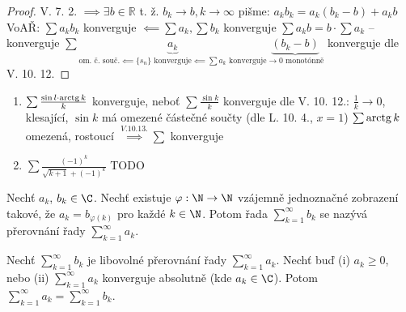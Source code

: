 \begin{proof}
    V. 7. 2. $\implies \exists b \in \mathbb R$ t. ž. $b_k \to b, k \to \infty$
    pišme: $a_kb_k=a_k(b_k-b)+a_kb$
    VoAŘ: $\sum a_kb_k$ konverguje $\impliedby \sum a_k, \sum b_k$ konverguje
    $\sum a_kb = b \cdot \sum a_k$ -- konverguje
    $\sum \underbrace{a_k}_{\text{om. č. souč.} \impliedby \{s_n\} \text{ konverguje}\impliedby \sum a_k \text{ konverguje}}\underbrace{(b_k-b)}_{\to 0 \text{ monotónně}}$ konverguje dle V. 10. 12.
\end{proof}

\begin{priklad}
    \begin{enumerate}[1)]
        \item $\sum \frac{\sin l \cdot \operatorname{arctg} k}{k}$ konverguje, neboť
            $\sum \frac{\sin k}{k}$ konverguje dle V. 10. 12.: $\frac{1}{k}\to 0$, klesající, $\sin k$ má omezené částečné součty (dle L. 10. 4., $x=1$)
            $\sum \operatorname{arctg} k$ omezená, rostoucí
            $\stackrel{V. 10. 13.}{\implies} \sum$ konverguje
        \item $\sum\frac{(-1)^k}{\sqrt{k+1}+(-1)^k}$ TODO
    \end{enumerate}
\end{priklad}

\begin{definice}
  Nechť $a_k$, $b_k \in \C$. Nechť existuje $\varphi: \N \to \N$ vzájemně jednoznačné zobrazení takové, že $a_k = b_{\varphi(k)}$ pro každé $k \in \N$. Potom řada $\sum_{k=1}^{\infty} b_k$ se nazývá přerovnání řady $\sum_{k=1}^{\infty} a_k$.
\end{definice}

\begin{veta}
  Nechť $\sum_{k=1}^{\infty} b_k$ je libovolné přerovnání řady $\sum_{k=1}^{\infty} a_k$. Nechť buď (i) $a_k \geq 0$, nebo (ii) $\sum_{k=1}^{\infty} a_k$ konverguje absolutně (kde $a_k \in \C$). Potom $\sum_{k=1}^{\infty} a_k = \sum_{k=1}^{\infty} b_k$.
\end{veta}

